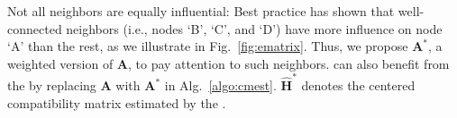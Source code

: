 Not all neighbors are equally influential:
Best practice has shown that well-connected neighbors
(i.e., nodes `B', `C', and `D') have more influence on node `A' than the rest, as we illustrate in Fig.~\ref{fig:ematrix}.
Thus, 
we propose \emphasis ${\boldsymbol A}^{*}$, a weighted version of ${\boldsymbol A}$, to pay attention to such neighbors.
\methodest can also benefit from the \emphasis by replacing ${\boldsymbol A}$ with ${\boldsymbol A}^{*}$ in Alg.~\ref{algo:cmest}.
$\hat{\boldsymbol{H}}^{*}$ denotes the centered compatibility matrix estimated by the \emphasis.

